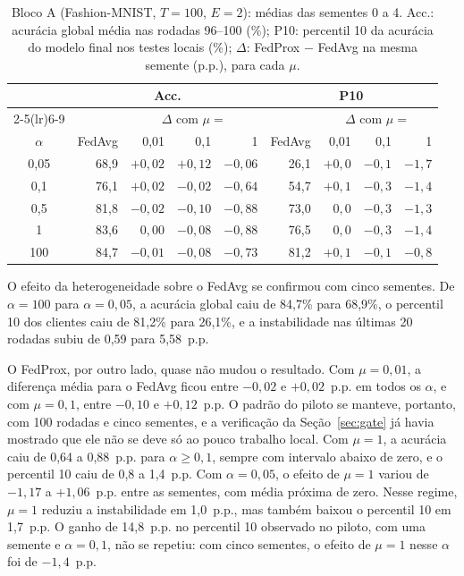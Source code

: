 \begin{table}[ht]
    \centering\small
    \caption{Bloco A (Fashion-MNIST, $T = 100$, $E = 2$): médias das sementes 0 a 4. Acc.: acurácia global média nas rodadas 96--100 (\%); P10: percentil 10 da acurácia do modelo final nos testes locais (\%); $\Delta$: FedProx $-$ FedAvg na mesma semente (p.p.), para cada $\mu$.}
    \label{tab:blocoA}
    \setlength{\tabcolsep}{2.4pt}
    \begin{tabular}{@{}crrrrrrrr@{}}
        \toprule
        & \multicolumn{4}{c}{Acc.} & \multicolumn{4}{c}{P10} \\
        \cmidrule(lr){2-5}\cmidrule(lr){6-9}
        & & \multicolumn{3}{c}{$\Delta$ com $\mu =$} & & \multicolumn{3}{c}{$\Delta$ com $\mu =$} \\
        $\alpha$ & FedAvg & 0,01 & 0,1 & 1 & FedAvg & 0,01 & 0,1 & 1 \\
        \midrule
        0,05 & 68{,}9 & $+0{,}02$ & $+0{,}12$ & $-0{,}06$ & 26{,}1 & $+0{,}0$ & $-0{,}1$ & $-1{,}7$ \\
        0,1  & 76{,}1 & $+0{,}02$ & $-0{,}02$ & $-0{,}64$ & 54{,}7 & $+0{,}1$ & $-0{,}3$ & $-1{,}4$ \\
        0,5  & 81{,}8 & $-0{,}02$ & $-0{,}10$ & $-0{,}88$ & 73{,}0 & $0{,}0$ & $-0{,}3$ & $-1{,}3$ \\
        1    & 83{,}6 & $0{,}00$ & $-0{,}08$ & $-0{,}88$ & 76{,}5 & $0{,}0$ & $-0{,}3$ & $-1{,}4$ \\
        100  & 84{,}7 & $-0{,}01$ & $-0{,}08$ & $-0{,}73$ & 81{,}2 & $+0{,}1$ & $-0{,}1$ & $-0{,}8$ \\
        \bottomrule
    \end{tabular}
\end{table}

O efeito da heterogeneidade sobre o FedAvg se confirmou com cinco sementes. De $\alpha = 100$ para $\alpha = 0{,}05$, a acurácia global caiu de 84,7\% para 68,9\%, o percentil 10 dos clientes caiu de 81,2\% para 26,1\%, e a instabilidade nas últimas 20 rodadas subiu de 0,59 para 5,58~p.p.

O FedProx, por outro lado, quase não mudou o resultado. Com $\mu = 0{,}01$, a diferença média para o FedAvg ficou entre $-0{,}02$ e $+0{,}02$~p.p. em todos os $\alpha$, e com $\mu = 0{,}1$, entre $-0{,}10$ e $+0{,}12$~p.p. O padrão do piloto se manteve, portanto, com 100 rodadas e cinco sementes, e a verificação da Seção~\ref{sec:gate} já havia mostrado que ele não se deve só ao pouco trabalho local. Com $\mu = 1$, a acurácia caiu de 0,64 a 0,88~p.p. para $\alpha \geq 0{,}1$, sempre com intervalo abaixo de zero, e o percentil 10 caiu de 0,8 a 1,4~p.p. Com $\alpha = 0{,}05$, o efeito de $\mu = 1$ variou de $-1{,}17$ a $+1{,}06$~p.p. entre as sementes, com média próxima de zero. Nesse regime, $\mu = 1$ reduziu a instabilidade em 1,0~p.p., mas também baixou o percentil 10 em 1,7~p.p. O ganho de 14,8~p.p. no percentil 10 observado no piloto, com uma semente e $\alpha = 0{,}1$, não se repetiu: com cinco sementes, o efeito de $\mu = 1$ nesse $\alpha$ foi de $-1{,}4$~p.p.

